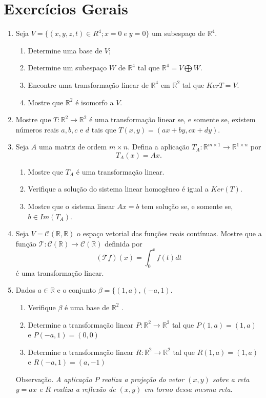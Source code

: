 \section{Exercícios Gerais}
\begin{enumerate}

\item  Seja $V= \{(x, y, z, t) \in R^4; x=0 \; e \; y=0\}$ um subespaço de $\mathbb{R}^4$.
    \begin{enumerate}
    \item Determine uma base de $V$;
    \item Determine um subespaço $W$ de $\mathbb{R}^4$ tal que $\mathbb{R}^4 = V \bigoplus W$.
    \item Encontre uma transformação linear de $\mathbb{R}^4$ em $\mathbb{R}^2$ tal que $KerT=V$.
\item Mostre que $\mathbb{R}^2$ é isomorfo a $V$.
      \end{enumerate}

\item {Mostre que $T:\mathbb{R}^2 \rightarrow\mathbb{R}^2$ é uma transformação linear se, e somente se, existem números reais $a, b, c$ e $ d$ tais que $T(x,y)=(ax+by, cx+dy).$}

\item Seja $A$ uma matriz de ordem $m\times n$. Defina a aplicação $T_A: \mathbb{R}^{m\times 1} \rightarrow \mathbb{R}^{1\times n} $ por $$T_A(x)=Ax.$$
\begin{enumerate}[label=(\alph*)]
\item Mostre que $T_A$ é uma transformação linear.
\item Verifique a solução do sistema linear homogêneo é igual a $Ker(T)$.
\item Mostre que o sistema linear $Ax=b$ tem solução se, e somente se, $b \in Im(T_A).$
\end{enumerate}

\item Seja $V=\mathcal{C}(\mathbb{R},\mathbb{R})$ o espaço vetorial das funções  reais contínuas. Mostre que a função   $\mathcal{T}: \mathcal{C}(\mathbb{R}) \rightarrow \mathcal{C}(\mathbb{R})$ definida por$$(\mathcal{T}f)(x)=\int_{0}^{x} f(t)dt$$ é uma transformação linear.

\item  Dados $a \in \mathbb{R}$ e  o conjunto $\beta= \{(1,a), (-a,1)$.
\begin{enumerate}[label=(\alph*)]
\item Verifique  $\beta$ é uma base de $\mathbb{R}^2$ .
\item Determine a transformação linear $P: \mathbb{R}^2 \rightarrow \mathbb{R}^2$ tal que $P(1,a)=(1,a)$  e $P(-a,1)=(0,0)$
\item Determine a transformação linear $R: \mathbb{R}^2 \rightarrow \mathbb{R}^2$ tal que $R(1,a)=(1,a)$  e $R(-a,1)=(a,-1)$
\end{enumerate}
Observação. \textit{A aplicação $P$  realiza  a projeção do vetor $(x,y)$ sobre a reta $y=ax$ e  $R$ realiza  a reflexão de $(x,y)$ em torno dessa mesma reta}.

\end{enumerate}
